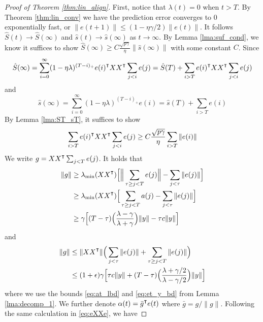 \begin{proof}[Proof of Theorem \ref{thm:lin_align}]
First, notice that $\lambda(t)=0$ when $t>T$. By Theorem \ref{thm:lin_conv} we have the prediction error converges to 0 exponentially fast, or $\|e(t+1)\|\leq (1-\eta\gamma/2)\|e(t)\|$. It follows $\hat{S}(t)\to \hat{S}(\infty)$ and $\hat{s}(t)\to \hat{s}(\infty)$ as $t\to\infty$. By Lemma \ref{lma:suf_cond}, we know it suffices to show $\hat{S}(\infty)\geq C\frac{\sqrt{p\gamma}}{\eta}\|\hat{s}(\infty)\|$ with some constant $C$. Since 
\begin{equation*}
\hat{S}(\infty) = \sum_{i=0}^\infty(1-\eta\lambda)^{(T-i)_+}e(i)\transpose XX\transpose \sum_{j<i} e(j) = \hat{S}(T)+ \sum_{i>T}e(i)\transpose XX\transpose \sum_{j<i}e(j)
\end{equation*}
and 
\begin{equation*}
\hat{s}(\infty) = \sum_{i=0}^\infty(1-\eta\lambda)^{(T-i)_+}e(i)= \hat{s}(T)+ \sum_{i>T}e(i)
\end{equation*}
By Lemma \ref{lma:ST_sT}, it suffices to show 
\begin{equation}
\label{eq:exxe_e_bd}
    \sum_{i>T}e(i)\transpose XX\transpose \sum_{j<i}e(j) \geq C\frac{\sqrt{p\gamma}}{\eta}\sum_{i>T}\|e(i)\|
\end{equation}
We write $g = XX\transpose \sum_{j<T}e(j)$. It holds that
\begin{equation}
\label{eq:g_lbd}
\begin{aligned}
\|g\| &\geq \lambda_{\min}(XX\transpose) \Big[\Big\|\sum_{\tau\geq j<T}e(j)\Big\|-\sum_{j<\tau}\|e(j)\|\Big] \\
&\geq\lambda_{\min}(XX\transpose) \Big[\sum_{\tau\geq j<T}a(j)-\sum_{j<\tau}\|e(j)\|\Big] \\
&\geq \gamma\Big[(T-\tau)\Big(\frac{\lambda-\gamma}{\lambda+\gamma}\Big)\|y\| - \tau c\|y\|\Big]
\end{aligned}
\end{equation}
and
\begin{equation}
\label{eq:g_ubd}
\begin{aligned}
\|g\| &\leq \|XX\transpose\| \Big(\sum_{j<\tau}\|e(j)\| + \sum_{\tau\geq j<T}\|e(j)\|\Big) \\
&\leq (1+\epsilon)\gamma\Big[\tau c\|y\|+ (T-\tau)\Big(\frac{\lambda+\gamma/2}{\lambda-\gamma/2}\Big)\|y\|\Big]
\end{aligned}
\end{equation}
where we use the bounds \eqref{eq:at_lbd} and \eqref{eq:et_y_bd} from Lemma \ref{lma:decomp_1}. We further denote $\alpha(t) = \bar{g}\transpose e(t)$ where $\bar{g} = g/\|g\|$. Following the same calculation in \eqref{eq:eXXe}, we have

\end{proof}
